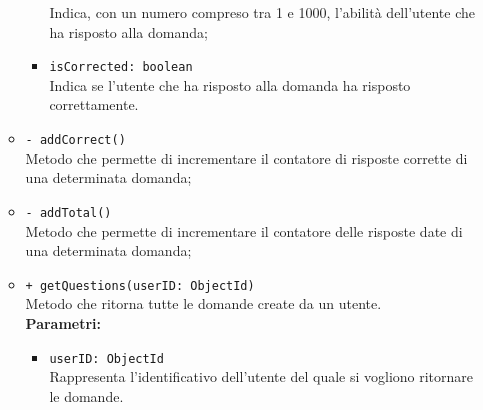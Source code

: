 \begin{itemize}
\begin{itemize}
\begin{itemize}
				Indica, con un numero compreso tra 1 e 1000, l'abilità dell'utente che ha risposto alla domanda;
				\item \texttt{isCorrected: boolean} \\
				Indica se l'utente che ha risposto alla domanda ha risposto correttamente.
			\end{itemize}  
	\item \texttt{- addCorrect()} \\
	Metodo che permette di incrementare il contatore di risposte corrette di una determinata domanda;
	\item \texttt{- addTotal()} \\
	Metodo che permette di incrementare il contatore delle risposte date di una determinata domanda;
	\item \texttt{+ getQuestions(userID: ObjectId)}\\
	Metodo che ritorna tutte le domande create da un utente.\\
	\textbf{Parametri:}
	\begin{itemize}
		\item \texttt{userID: ObjectId}\\
		Rappresenta l'identificativo dell'utente del quale si vogliono ritornare le domande.
	\end{itemize}
	\end{itemize}
\end{itemize}
